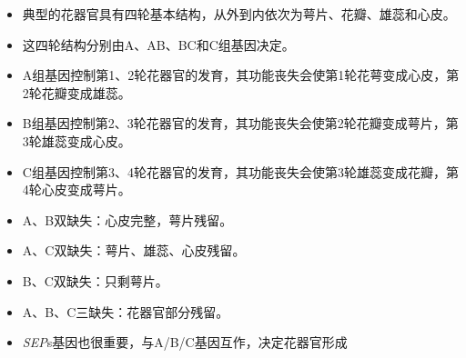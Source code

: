 \begin{enumerate}
    \begin{itemize}
        \item 典型的花器官具有四轮基本结构，从外到内依次为萼片、花瓣、雄蕊和心皮。
        \item 这四轮结构分别由A、AB、BC和C组基因决定。
        \item A组基因控制第1、2轮花器官的发育，其功能丧失会使第1轮花萼变成心皮，第2轮花瓣变成雄蕊。
        \item B组基因控制第2、3轮花器官的发育，其功能丧失会使第2轮花瓣变成萼片，第3轮雄蕊变成心皮。
        \item C组基因控制第3、4轮花器官的发育，其功能丧失会使第3轮雄蕊变成花瓣，第4轮心皮变成萼片。
        \item A、B双缺失：心皮完整，萼片残留。
        \item A、C双缺失：萼片、雄蕊、心皮残留。
        \item B、C双缺失：只剩萼片。
        \item A、B、C三缺失：花器官部分残留。
        \item \emph{SEP}s基因也很重要，与A/B/C基因互作，决定花器官形成
    \end{itemize}
\end{enumerate}


